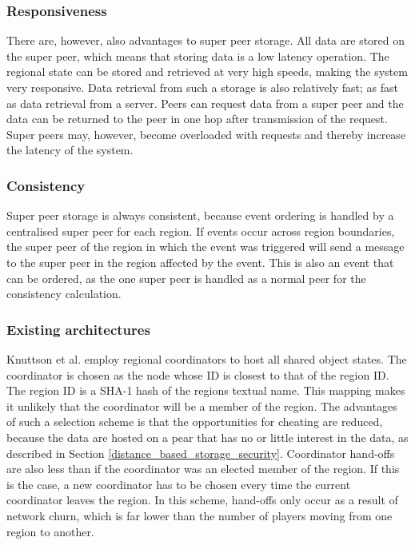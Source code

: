 \documentclass[10pt,a4paper,journal,cspaper,compsoc]{IEEEtran}
\begin{document}
\subsubsection{Responsiveness}
There are, however, also advantages to super peer storage. All data are stored on the super peer, which means that storing data is a low latency
operation. The regional state can be stored and retrieved at very high speeds, making the system very responsive. Data retrieval from such a storage
is also relatively fast; as fast as data retrieval from a server. Peers can request data from a super peer and the data can be returned to the peer
in one hop after transmission of the request. Super peers may, however, become overloaded with requests and thereby increase the latency of the
system.

\subsubsection{Consistency}
Super peer storage is always consistent, because event ordering is handled by a centralised super peer for each region. If events occur across region
boundaries, the super peer of the region in which the event was triggered will send a message to the super peer in the region affected by the event.
This is also an event that can be ordered, as the one super peer is handled as a normal peer for the consistency calculation.

\subsubsection{Existing architectures}

Knuttson et al. \cite{knutsson_p2p_first} employ regional coordinators to host all shared object states. The coordinator is chosen as the node whose
ID is closest to that of the region ID. The region ID is a SHA-1 hash of the regions textual name. This mapping makes it unlikely that the
coordinator will be a member of the region. The advantages of such a selection scheme is that the opportunities for cheating are reduced, because the
data are hosted on a pear that has no or little interest in the data, as described in Section \ref{distance_based_storage_security}. Coordinator
hand-offs are also less than if the coordinator was an elected member of the region. If this is the case, a new coordinator has to be chosen every
time the current coordinator leaves the region. In this scheme, hand-offs only occur as a result of network churn, which is far lower than the number
of players moving from one region to another.
\end{document}
